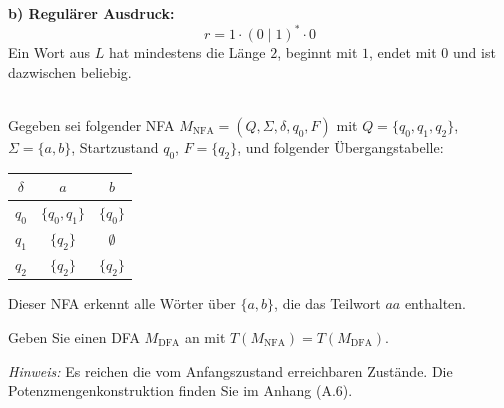 \begin{loesung}

\textbf{b) Regulärer Ausdruck:}
\[
  r = 1 \cdot (0\mid 1)^* \cdot 0
\]
Ein Wort aus $L$ hat mindestens die Länge $2$, beginnt mit $1$, endet mit $0$ und ist dazwischen beliebig.
\end{loesung}

\\
Gegeben sei folgender NFA $M_\text{NFA} = (Q, \Sigma, \delta, q_0, F)$ mit $Q = \{q_0, q_1, q_2\}$, $\Sigma = \{a,b\}$, Startzustand $q_0$, $F = \{q_2\}$, und folgender Übergangstabelle:

\begin{center}
\begin{tabular}{c|cc}
  $\delta$ & $a$ & $b$ \\
  \hline
  $q_0$ & $\{q_0, q_1\}$ & $\{q_0\}$ \\
  $q_1$ & $\{q_2\}$ & $\emptyset$ \\
  $q_2$ & $\{q_2\}$ & $\{q_2\}$ \\
\end{tabular}
\end{center}

Dieser NFA erkennt alle Wörter über $\{a,b\}$, die das Teilwort $aa$ enthalten.

Geben Sie einen DFA $M_\text{DFA}$ an mit $T(M_\text{NFA}) = T(M_\text{DFA})$.

\textit{Hinweis:} Es reichen die vom Anfangszustand erreichbaren Zustände. Die Potenzmengenkonstruktion finden Sie im Anhang (A.6).

